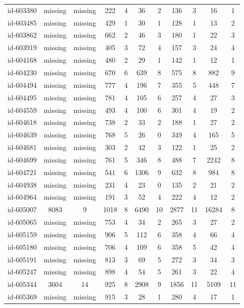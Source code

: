 \begin{tabular}{ccccccccccc}
id-603380 & missing & missing & 222 & 4 & 36 & 2 & 136 & 3 & 16 & 1\\
id-603485 & missing & missing & 429 & 1 & 30 & 1 & 128 & 1 & 13 & 2\\
id-603862 & missing & missing & 662 & 2 & 46 & 3 & 180 & 1 & 22 & 3\\
id-603919 & missing & missing & 405 & 3 & 72 & 4 & 157 & 3 & 24 & 4\\
id-604168 & missing & missing & 480 & 2 & 29 & 1 & 142 & 1 & 12 & 1\\
id-604230 & missing & missing & 670 & 6 & 639 & 8 & 575 & 8 & 882 & 9\\
id-604494 & missing & missing & 777 & 4 & 196 & 7 & 355 & 5 & 448 & 7\\
id-604495 & missing & missing & 781 & 4 & 105 & 6 & 257 & 4 & 27 & 3\\
id-604559 & missing & missing & 493 & 4 & 100 & 6 & 301 & 4 & 19 & 2\\
id-604618 & missing & missing & 738 & 2 & 33 & 2 & 188 & 1 & 27 & 2\\
id-604639 & missing & missing & 768 & 5 & 26 & 0 & 349 & 4 & 165 & 5\\
id-604681 & missing & missing & 303 & 2 & 42 & 3 & 122 & 1 & 25 & 2\\
id-604699 & missing & missing & 761 & 5 & 346 & 8 & 488 & 7 & 2242 & 8\\
id-604721 & missing & missing & 541 & 6 & 1306 & 9 & 632 & 8 & 984 & 8\\
id-604938 & missing & missing & 231 & 4 & 23 & 0 & 135 & 2 & 21 & 2\\
id-604964 & missing & missing & 191 & 3 & 52 & 4 & 222 & 4 & 12 & 2\\
id-605007 & 8083 & 9 & 1018 & 8 & 6490 & 10 & 2877 & 11 & 16284 & 8\\
id-605065 & missing & missing & 753 & 4 & 34 & 2 & 265 & 3 & 27 & 2\\
id-605159 & missing & missing & 906 & 5 & 112 & 6 & 358 & 4 & 66 & 4\\
id-605180 & missing & missing & 706 & 4 & 109 & 6 & 358 & 5 & 42 & 4\\
id-605191 & missing & missing & 813 & 3 & 69 & 5 & 272 & 3 & 34 & 3\\
id-605247 & missing & missing & 898 & 4 & 54 & 5 & 261 & 3 & 22 & 4\\
id-605344 & 3604 & 14 & 925 & 8 & 2908 & 9 & 1856 & 11 & 5109 & 11\\
id-605369 & missing & missing & 915 & 3 & 28 & 1 & 280 & 4 & 17 & 1\\

\end{tabular}
